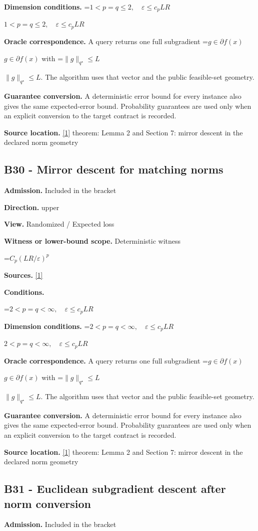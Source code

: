\documentclass[10pt,a4paper]{article}
\newcommand{\AtlasMath}[1]{\par\begingroup\centering\setbox0=\hbox{$\displaystyle #1$}\ifdim\wd0>1.4\linewidth\typeout{ATLAS WIDE FORMULA: \the\wd0}\fi\ifdim\wd0>\linewidth\resizebox{\linewidth}{!}{\box0}\else\box0\fi\par\endgroup}
\newcommand{\AtlasInlineMath}[1]{\begingroup\setbox0=\hbox{$#1$}\ifdim\wd0>.4\linewidth\endgroup\AtlasMath{#1}\else\endgroup$#1$\fi}
\begin{document}
\textbf{Dimension conditions.} \AtlasInlineMath{1<p=q\le2,\quad\varepsilon\le c_pLR}

\textbf{Oracle correspondence.} A query returns one full subgradient \AtlasInlineMath{g\in\partial f(x)} with \AtlasInlineMath{\|g\|_{q^\star}\le L}. The algorithm uses that vector and the public feasible-set geometry.

\textbf{Guarantee conversion.} A deterministic error bound for every instance also gives the same expected-error bound. Probability guarantees are used only when an explicit conversion to the target contract is recorded.

\textbf{Source location.} \href{https://arxiv.org/pdf/1107.4080}{[1]} theorem: Lemma 2 and Section 7: mirror descent in the declared norm geometry

\subsection{B30 - Mirror descent for matching norms}
\textbf{Admission.} Included in the bracket

\textbf{Direction.} upper

\textbf{View.} Randomized / Expected loss

\textbf{Witness or lower-bound scope.} Deterministic witness

\AtlasMath{C_p(LR/\varepsilon)^p}
\textbf{Sources.} \href{https://arxiv.org/pdf/1107.4080}{[1]}

\textbf{Conditions.} 
\AtlasMath{2<p=q<\infty,\quad\varepsilon\le c_pLR}


\textbf{Dimension conditions.} \AtlasInlineMath{2<p=q<\infty,\quad\varepsilon\le c_pLR}

\textbf{Oracle correspondence.} A query returns one full subgradient \AtlasInlineMath{g\in\partial f(x)} with \AtlasInlineMath{\|g\|_{q^\star}\le L}. The algorithm uses that vector and the public feasible-set geometry.

\textbf{Guarantee conversion.} A deterministic error bound for every instance also gives the same expected-error bound. Probability guarantees are used only when an explicit conversion to the target contract is recorded.

\textbf{Source location.} \href{https://arxiv.org/pdf/1107.4080}{[1]} theorem: Lemma 2 and Section 7: mirror descent in the declared norm geometry

\subsection{B31 - Euclidean subgradient descent after norm conversion}
\textbf{Admission.} Included in the bracket
\end{document}
